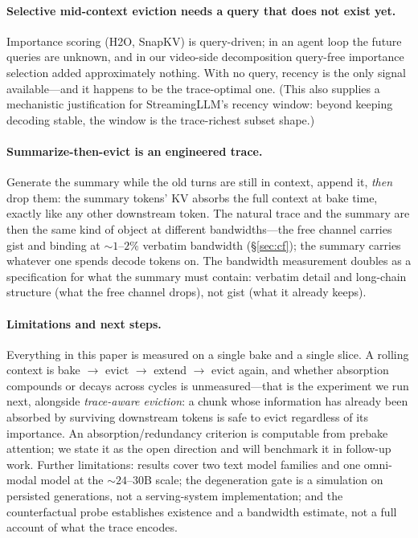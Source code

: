 \documentclass[11pt]{article}
\begin{document}
\paragraph{Selective mid-context eviction needs a query that does not exist yet.}
Importance scoring (H2O, SnapKV) is query-driven; in an agent loop the future queries are unknown, and in our video-side decomposition query-free importance selection added approximately nothing. With no query, recency is the only signal available---and it happens to be the trace-optimal one. (This also supplies a mechanistic justification for StreamingLLM's recency window: beyond keeping decoding stable, the window is the trace-richest subset shape.)

\paragraph{Summarize-then-evict is an engineered trace.}
Generate the summary while the old turns are still in context, append it, \emph{then} drop them: the summary tokens' KV absorbs the full context at bake time, exactly like any other downstream token. The natural trace and the summary are then the same kind of object at different bandwidths---the free channel carries gist and binding at ${\sim}1$--$2\%$ verbatim bandwidth (\S\ref{sec:cf}); the summary carries whatever one spends decode tokens on. The bandwidth measurement doubles as a specification for what the summary must contain: verbatim detail and long-chain structure (what the free channel drops), not gist (what it already keeps).

\paragraph{Limitations and next steps.}
Everything in this paper is measured on a single bake and a single slice. A rolling context is bake $\rightarrow$ evict $\rightarrow$ extend $\rightarrow$ evict again, and whether absorption compounds or decays across cycles is unmeasured---that is the experiment we run next, alongside \emph{trace-aware eviction}: a chunk whose information has already been absorbed by surviving downstream tokens is safe to evict regardless of its importance. An absorption/redundancy criterion is computable from prebake attention; we state it as the open direction and will benchmark it in follow-up work. Further limitations: results cover two text model families and one omni-modal model at the ${\sim}24$--$30$B scale; the degeneration gate is a simulation on persisted generations, not a serving-system implementation; and the counterfactual probe establishes existence and a bandwidth estimate, not a full account of what the trace encodes.
\end{document}
